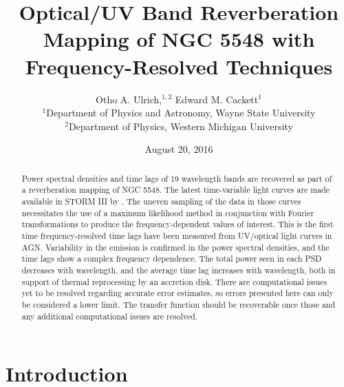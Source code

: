 \documentclass[11pt,letterpaper]{article}
\begin{document}
\title{Optical/UV Band
Reverberation Mapping of NGC 5548 with Frequency-Resolved Techniques}

\author{Otho A. Ulrich,$^{1,2}$  Edward M. Cackett$^{1}$\\
$^{1}$Department of Physics and Astronomy, Wayne State University\\
$^{2}$Department of Physics, Western Michigan University\\
}
\date{August 20, 2016}

\maketitle

\begin{abstract}

Power spectral densities and time lags of 19 wavelength bands are recovered as part of a reverberation mapping of NGC 5548. The latest time-variable light curves are made available in STORM III by \cite{2016ApJ...821...56F}. The uneven sampling of the data in those curves necessitates the use of a maximum likelihood method in conjunction with Fourier transformations to produce the frequency-dependent values of interest. This is the first time frequency-resolved time lags have been measured from UV/optical light curves in AGN. Variability in the emission is confirmed in the power spectral densities, and the time lags show a complex frequency dependence. The total power seen in each PSD decreases with wavelength, and the average time lag increases with wavelength, both in support of thermal reprocessing by an accretion disk. There are computational issues yet to be resolved regarding accurate error estimates, so errors presented here can only be considered a lower limit. The transfer function should be recoverable once those and any additional computational issues are resolved.

\end{abstract}


\section{Introduction}
\label{sec:intro}
\end{document}
